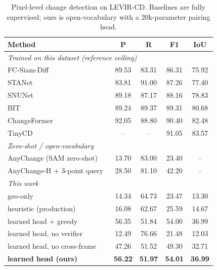 \begin{table}[t]
\centering
\caption{Pixel-level change detection on LEVIR-CD. Baselines are fully supervised; ours is open-vocabulary with a 20k-parameter pairing head.}
\label{tab:levir_cd_pixel}
\setlength{\tabcolsep}{4pt}
\begin{tabular}{lcccc}
\toprule
Method & P & R & F1 & IoU \\
\midrule
\multicolumn{5}{l}{\emph{Trained on this dataset (reference ceiling)}} \\
FC-Siam-Diff~\cite{daudt2018fully} & 89.53 & 83.31 & 86.31 & 75.92 \\
STANet~\cite{chen2020spatial} & 83.81 & 91.00 & 87.26 & 77.40 \\
SNUNet~\cite{fang2021snunet} & 89.18 & 87.17 & 88.16 & 78.83 \\
BIT~\cite{chen2021remote} & 89.24 & 89.37 & 89.31 & 80.68 \\
ChangeFormer~\cite{bandara2022transformer} & 92.05 & 88.80 & 90.40 & 82.48 \\
TinyCD~\cite{codegoni2023tinycd} & -- & -- & 91.05 & 83.57 \\
\midrule
\multicolumn{5}{l}{\emph{Zero-shot / open-vocabulary}} \\
AnyChange (SAM zero-shot)~\cite{zheng2024segment} & 13.70 & 83.00 & 23.40 & -- \\
AnyChange-H + 3-point query~\cite{zheng2024segment} & 28.50 & 81.10 & 42.20 & -- \\
\midrule
\multicolumn{5}{l}{\emph{This work}} \\
geo-only & 14.34 & 64.73 & 23.47 & 13.30 \\
heuristic (production) & 16.08 & 62.67 & 25.59 & 14.67 \\
learned head + greedy & 56.35 & 51.84 & 54.00 & 36.99 \\
learned head, no verifier & 12.49 & 76.66 & 21.48 & 12.03 \\
learned head, no cross-frame & 47.26 & 51.52 & 49.30 & 32.71 \\
\textbf{learned head (ours)} & \textbf{56.22} & \textbf{51.97} & \textbf{54.01} & \textbf{36.99} \\
\bottomrule
\end{tabular}
\end{table}
